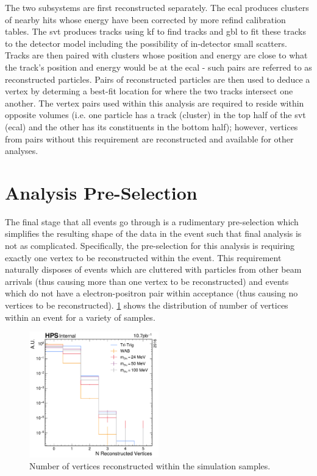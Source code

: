 The two subsystems are first reconstructed separately.
The \ac{ecal} produces clusters of nearby hits whose energy
have been corrected by more refind calibration tables.
The \ac{svt} produces tracks using \ac{kf} to find tracks
and \ac{gbl} to fit these tracks to the detector model including
the possibility of in-detector small scatters.
Tracks are then paired with clusters whose position and energy
are close to what the track's position and energy would be at
the \ac{ecal} - such pairs are referred to as reconstructed
particles.
Pairs of reconstructed particles are then used to deduce a
vertex by determing a best-fit location for where the two tracks
intersect one another.
The vertex pairs used within this analysis are required to reside
within opposite volumes (i.e. one particle has a track (cluster)
in the top half of the \ac{svt} (\ac{ecal}) and the other has its
constituents in the bottom half); however, vertices from pairs
without this requirement are reconstructed and available for
other analyses.

\section{Analysis Pre-Selection}
The final stage that all events go through is a rudimentary pre-selection which simplifies the
resulting shape of the data in the event such that final analysis is not as complicated.
Specifically, the pre-selection for this analysis is requiring exactly one vertex to be
reconstructed within the event. This requirement naturally disposes of events which are cluttered
with particles from other beam arrivals (thus causing more than one vertex to be reconstructed) and
events which do not have a electron-positron pair within acceptance (thus causing no vertices to be
reconstructed). \cref{fig:n-vertex-pre-selection} shows the distribution of number of vertices
within an event for a variety of samples.

\begin{figure}
  \centering
  \includegraphics[width=0.5\textwidth]{figures/hps/dataset/n-vertex-pre-selection-mc-only.pdf}
  \caption{Number of vertices reconstructed within the simulation samples.}
  \label{fig:n-vertex-pre-selection}
\end{figure}
